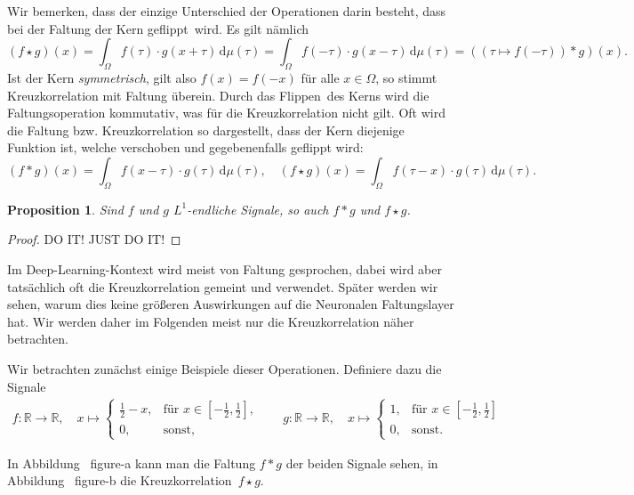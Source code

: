 \documentclass{article}
\newtheorem{proposition}[theorem]{Proposition}
\theoremstyle{definition}
\newcommand{\R}{\mathbb{R}}
\newcommand{\diff}{\,\textrm{d}}
\newcommand{\todo}[1]{{\color{red} #1}}
\begin{document}
Wir bemerken, dass der einzige Unterschied der Operationen darin besteht, dass bei der Faltung der Kern \glqq geflippt\grqq\ wird.
Es gilt nämlich \[
    \left(f \star g\right)(x) = \int_{\Omega} f(\tau) \cdot g(x+\tau) \diff\mu(\tau) = \int_\Omega f(-\tau) \cdot g(x - \tau) \diff\mu(\tau) = \left((\tau\mapsto f(-\tau)) * g\right)(x).
    \]
Ist der Kern \emph{symmetrisch}, gilt also $f(x) = f(-x)$ für alle $x\in\Omega$, so stimmt Kreuzkorrelation mit Faltung überein.
Durch das \glqq Flippen\grqq\ des Kerns wird die Faltungsoperation kommutativ, was für die Kreuzkorrelation nicht gilt.
Oft wird die Faltung bzw. Kreuzkorrelation so dargestellt, dass der Kern diejenige Funktion ist, welche verschoben und gegebenenfalls geflippt wird:
\[
    (f*g)(x) = \int_\Omega f(x - \tau) \cdot g(\tau)\diff\mu(\tau), \quad
    (f\star g)(x) = \int_\Omega f(\tau - x) \cdot g(\tau) \diff\mu(\tau).
\]

\begin{proposition}
    Sind $f$ und $g$ $L^1$-endliche Signale, so auch $f* g$ und $f\star g$.
\end{proposition}
\begin{proof}
    \todo{DO IT! JUST DO IT!}
\end{proof}

Im Deep-Learning-Kontext wird meist von Faltung gesprochen, dabei wird aber tatsächlich oft die Kreuzkorrelation gemeint und verwendet.
\todo{Später werden wir sehen, warum dies keine größeren Auswirkungen auf die Neuronalen Faltungslayer hat.}
Wir werden daher im Folgenden meist nur die Kreuzkorrelation näher betrachten.

Wir betrachten zunächst einige Beispiele dieser Operationen.
Definiere dazu die Signale
\begin{align*}
    f: \R \rightarrow \R, \quad x \mapsto \begin{cases}
        \frac{1}{2} - x, & \text{für $x\in[-\frac{1}{2},\frac{1}{2}]$,}\\
        0, & \text{sonst,}
    \end{cases} \qquad
    g: \R \rightarrow \R,\quad x \mapsto \begin{cases}
        1,& \text{für $x \in [-\frac{1}{2},\frac{1}{2}]$}\\
        0, & \text{sonst.}
    \end{cases}
\end{align*}

In Abbildung~\todo{figure-a} kann man die Faltung $f * g$ der beiden Signale sehen, in Abbildung~\todo{figure-b} die Kreuzkorrelation~$f\star g$.
\end{document}
